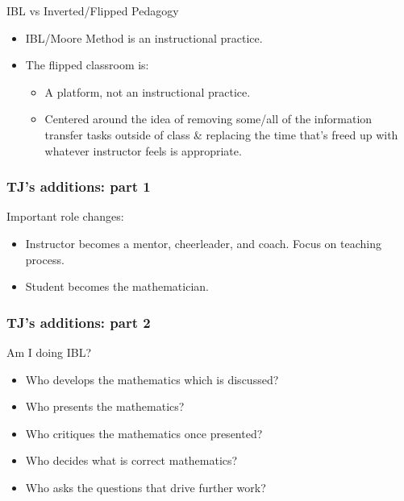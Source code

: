 \documentclass[10pt]{beamer}
\begin{document}

\begin{frame}

\begin{block}{IBL vs Inverted/Flipped Pedagogy}
\begin{itemize}
\item <2->IBL/Moore Method is an instructional practice.
\item<3-> The flipped classroom is:
    \begin{itemize}\normalsize
    \item<4-> A platform, not an instructional practice. 
    \item<5-> Centered around the idea of removing some/all of the information transfer tasks outside of class \& replacing the time that's freed up with whatever instructor feels is appropriate.
    \end{itemize}
\end{itemize}
\end{block}

\end{frame}


\begin{frame}
\frametitle{TJ's additions: part 1}

Important role changes:
\begin{itemize}
\item Instructor becomes a mentor, cheerleader, and coach. Focus on teaching process.
\item Student becomes the mathematician.
\end{itemize}

\end{frame}


\begin{frame}
\frametitle{TJ's additions: part 2}

Am I doing IBL?
\begin{itemize}
\item<2-> Who develops the mathematics which is discussed?
\item<3-> Who presents the mathematics?
\item<4-> Who critiques the mathematics once presented?
\item<5-> Who decides what is correct mathematics?
\item<6-> Who asks the questions that drive further work?
\end{itemize}

\end{frame}
\end{document}
